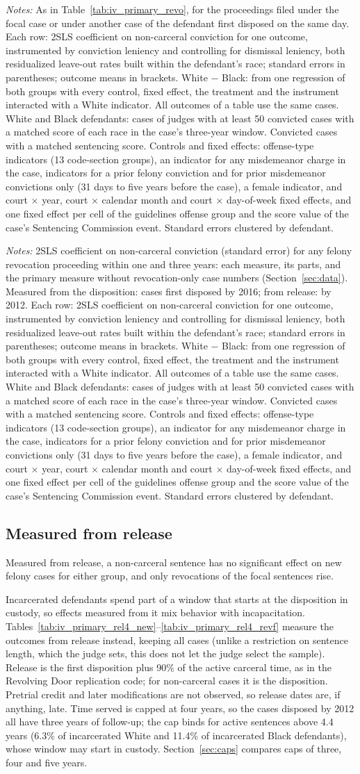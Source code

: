 \documentclass[11pt]{article}
\newcommand{\tabnote}[1]{\par\vspace{0.6ex}\begin{minipage}{\linewidth}\linespread{1}\footnotesize\textit{Notes:} #1\end{minipage}}
\newcommand{\controlsnote}{offense-type indicators (13 code-section groups), an indicator for any misdemeanor charge in the case, indicators for a prior felony conviction and for prior misdemeanor convictions only (31 days to five years before the case), a female indicator, and court $\times$ year, court $\times$ calendar month and court $\times$ day-of-week fixed effects}
\newcommand{\specnoteprim}{Convicted cases with a matched sentencing score. Controls and fixed effects: \controlsnote, and one fixed effect per cell of the guidelines offense group and the score value of the case's Sentencing Commission event. Standard errors clustered by defendant.}
\newcommand{\racesamplenote}{White and Black defendants: cases of judges with at least 50 convicted cases with a matched score of each race in the case's three-year window.}
\newcommand{\ivnote}{Each row: 2SLS coefficient on non-carceral conviction for one outcome, instrumented by conviction leniency and controlling for dismissal leniency, both residualized leave-out rates built within the defendant's race; standard errors in parentheses; outcome means in brackets. White $-$ Black: from one regression of both groups with every control, fixed effect, the treatment and the instrument interacted with a White indicator. All outcomes of a table use the same cases. \racesamplenote}
\begin{document}
\begin{table}[H]
\centering
\caption{2SLS from the disposition: non-carceral conviction and revocations of the focal sentences (secondary revocation measure)}\label{tab:iv_primary_revf}
{\small\linespread{1}\selectfont\renewcommand{\arraystretch}{0.9}}
\tabnote{As in Table~\ref{tab:iv_primary_revo}, for the proceedings filed under the focal case or under another case of the defendant first disposed on the same day. \ivnote{} \specnoteprim}
\end{table}

\begin{table}[H]
\centering
\caption{2SLS on revocation proceedings from the disposition and from release: the two measures and their parts}\label{tab:rev_parts}
{\small\renewcommand{\arraystretch}{0.8}}
\tabnote{2SLS coefficient on non-carceral conviction (standard error) for any felony revocation proceeding within one and three years: each measure, its parts, and the primary measure without revocation-only case numbers (Section~\ref{sec:data}). Measured from the disposition: cases first disposed by 2016; from release: by 2012. \ivnote{} \specnoteprim}
\end{table}

\subsection{Measured from release}\label{sec:release}

Measured from release, a non-carceral sentence has no significant effect on new felony cases for either group, and only revocations of the focal sentences rise.

Incarcerated defendants spend part of a window that starts at the disposition in custody, so effects measured from it mix behavior with incapacitation. Tables~\ref{tab:iv_primary_rel4_new}--\ref{tab:iv_primary_rel4_revf} measure the outcomes from release instead, keeping all cases (unlike a restriction on sentence length, which the judge sets, this does not let the judge select the sample). Release is the first disposition plus 90\% of the active carceral time, as in the Revolving Door replication code; for non-carceral cases it is the disposition. Pretrial credit and later modifications are not observed, so release dates are, if anything, late. Time served is capped at four years, so the cases disposed by 2012 all have three years of follow-up; the cap binds for active sentences above 4.4 years (6.3\% of incarcerated White and 11.4\% of incarcerated Black defendants), whose window may start in custody. Section~\ref{sec:caps} compares caps of three, four and five years.
\end{document}
